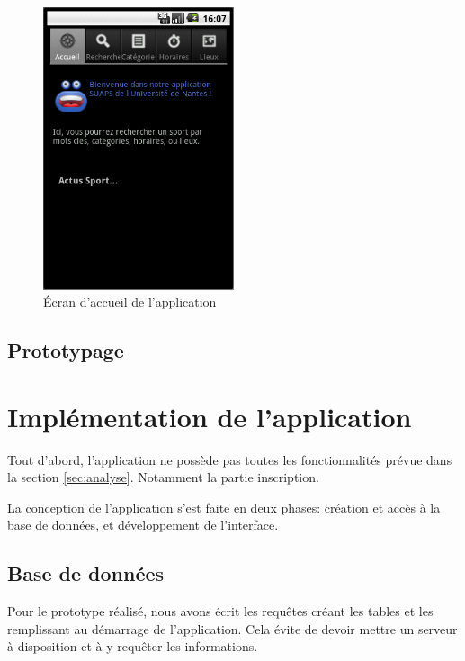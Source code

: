 \documentclass[french, titlepage, 11pt, a4paper]{article}
\begin{document}
		\begin{figure}[ht]
			\centering
				\includegraphics[width=0.5\textwidth]{accueil.png}
				\caption{Écran d'accueil de l'application}
			\label{fig:allocine}
			\end{figure}





	\subsection{Prototypage}

\section{Implémentation de l'application}

    Tout d'abord, l'application ne possède pas toutes les fonctionnalités prévue
    dans la section \ref{sec:analyse}. Notamment la partie inscription.


    La conception de l'application s'est faite en deux phases: création et accès
    à la base de données, et développement de l'interface.

    \subsection{Base de données}

        Pour le prototype réalisé, nous avons écrit les requêtes créant les
        tables et les remplissant au démarrage de l'application. Cela évite de
        devoir mettre un serveur à disposition et à y requêter les informations.
\end{document}
